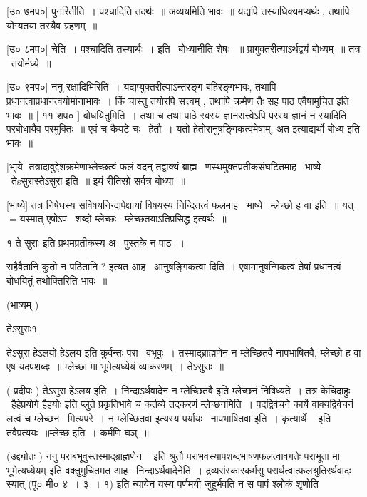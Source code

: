 \documentclass[11pt, openany]{book}
\begin{document}
 [उ० ७मप०] पुनरितीति~। पश्चादिति तदर्थः~॥ अव्ययमिति भावः~॥ यद्यपि
तस्याधिक्यमप्यर्थः , तथापि योग्यतया तस्यैव ग्रहणम्~॥ 

 [उ० ८मप०] चेति~। पश्चादिति तस्यार्थः~। इति \textendash\ बोध्यानीति शेषः
~॥ प्रागुक्तरीत्याऽर्थद्वयं बोध्यम्~॥ तत्र \textendash\ तयोर्मध्ये~॥ 

 [उ० ९मप०] ननु रक्षादिभिरिति~। यद्यप्युक्तरीत्याऽन्तरङ्ग
बहिरङ्गभावः, तथापि प्रधानत्वाप्रधानत्वयोर्मानाभावः~। किं चास्तु तयोरपि
सत्त्वम् , तथापि क्रमेण तैः सह पाठ एवैषामुचित इति भावः~॥ [ ११ शप० ]
बोधयितुमिति~। तथा च तथा पाठे स्वस्य ज्ञानसत्त्वेऽपि परस्य ज्ञानं न
स्यादिति परबोधायैव परमुक्तिः~॥ एवं च कैयटे चः \textendash\ हेतौ~। यतो
हेतोरानुषङ्गिकत्वमेषाम्, अत इत्याद्यर्थो बोध्य इति भावः~॥ 

 [भा्ये] तत्रादावुद्देशक्रमेणाभ्लेच्छत्वं फलं वदन् तद्वाक्यं
ब्राह्म \textendash\ णस्थमुक्तप्रतीकसंघटितमाह \textendash\ भाष्ये \textendash\ तेsसुरास्तेऽसुरा इति~॥
इयं रीतिरग्रे सर्वत्र बोध्या~॥ 

 [भाष्ये] तत्र निषेधस्य सविषयनिन्दापेक्षायां विषयस्य निन्दितत्वं
फलमाह \textendash\ भाष्ये \textendash\ म्लेच्छो ह वा इति~॥ यत्$=$यस्मात् एषोऽप \textendash\ शब्दो
म्लेच्छः \textendash\ म्लेच्छतयाऽतिप्रसिद्ध इत्यर्थः~॥



१ ते सुराः इति प्रथमप्रतीकस्य अ \textendash\ पुस्तके न पाठः~। 



सहैवैतानि कुतो न पठितानि ? इत्यत आह \textendash\ आनुषङ्गिकत्वा दिति~। 
एषामानुषन्गिकत्वं तेषां प्रधानत्वं बोधयितुं तथोक्तिरिति भावः~॥ 

 (भाष्यम् ) 

तेऽसुराः१ \textendash\ 

{\qt तेऽसुरा हेऽलयो हेऽलय इति कुर्वन्तः परा \textendash\ वभूवुः~। 
तस्माद्ब्राह्मणेन न म्लेच्छितवै नापभाषितवै, म्लेच्छो ह वा एष यदपशब्दः~॥} म्लेच्छा मा भूमेत्यध्येयं व्याकरणम्~। तेऽसुराः~॥ 

 ( प्रदीपः ) तेऽसुरा हेऽलय इति~। निन्दाऽर्थवादेन {\qt न
म्लेच्छितवै} इति म्लेच्छनं निषिध्यते~। तत्र केचिदाहुः \textendash\ 
{\qt हैहेप्रयोगे हैहयोः} इति प्लुते प्रकृतिभावे च कर्तव्ये तदकरणं
म्लेच्छनमिति~। पदद्विर्वचने कार्ये वाक्यद्विर्वचनं लत्वं च म्लेच्छन \textendash\ 
मित्यपरे~। न म्लेच्छितवा इत्यस्य पर्यायः \textendash\ नापभाषितवा इति~। 
{\qt कृत्यार्थे \textendash\ } इति तवैप्रत्ययः~॥म्लेच्छ इति~। कर्मणि घञ्~॥ 

 (उद्द्योतः ) ननु {\qt पराबभूवुस्तस्माद्ब्राह्मणेन \textendash\ } इति श्रुतौ
पराभवस्यापशब्दभाषणफलत्वावगतेः {\qt पराभूता मा भूमेत्यध्येयम्} इति
वक्तुमुचितमत आह \textendash\ निन्दाऽर्थवादेनेति~। {\qt द्रव्यसंस्कारकर्मसु
परार्थत्वात्फलश्रुतिरर्थवादः स्यात्} (पू० मी० ४~। ३~। १) इति न्यायेन
{\qt यस्य पर्णमयी जुहूर्भवति न स पापं श्लोकं शृणोति} 
\end{document}
